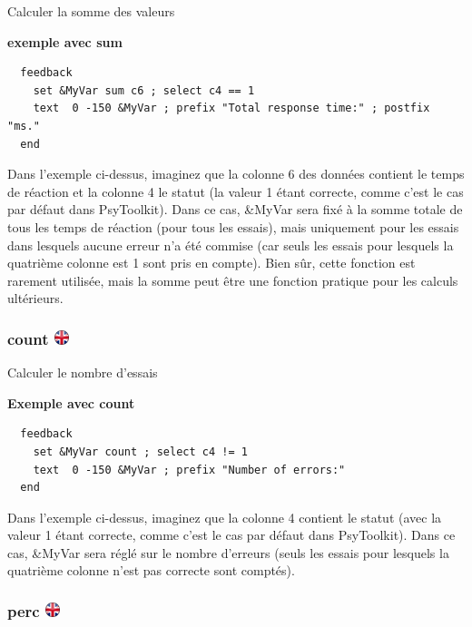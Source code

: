 \documentclass[
]{book}
\begin{document}
Calculer la somme des valeurs

\textbf{exemple avec sum }

\begin{verbatim}
  feedback
    set &MyVar sum c6 ; select c4 == 1
    text  0 -150 &MyVar ; prefix "Total response time:" ; postfix "ms."
  end
\end{verbatim}

Dans l'exemple ci-dessus, imaginez que la colonne 6 des données contient
le temps de réaction et la colonne 4 le statut (la valeur 1 étant
correcte, comme c'est le cas par défaut dans PsyToolkit). Dans ce cas,
\&MyVar sera fixé à la somme totale de tous les temps de réaction (pour
tous les essais), mais uniquement pour les essais dans lesquels aucune
erreur n'a été commise (car seuls les essais pour lesquels la quatrième
colonne est 1 sont pris en compte). Bien sûr, cette fonction est
rarement utilisée, mais la somme peut être une fonction pratique pour
les calculs ultérieurs.

\hypertarget{count}{%
\subsubsection[count ]{\texorpdfstring{count
\href{https://www.psytoolkit.org/doc3.1.0/feedback.html\#_count}{\protect\includegraphics{img/ukflag.png}}}{count }}\label{count}}

Calculer le nombre d'essais

\textbf{Exemple avec count}

\begin{verbatim}
  feedback
    set &MyVar count ; select c4 != 1
    text  0 -150 &MyVar ; prefix "Number of errors:"
  end
\end{verbatim}

Dans l'exemple ci-dessus, imaginez que la colonne 4 contient le statut
(avec la valeur 1 étant correcte, comme c'est le cas par défaut dans
PsyToolkit). Dans ce cas, \&MyVar sera réglé sur le nombre d'erreurs
(seuls les essais pour lesquels la quatrième colonne n'est pas correcte
sont comptés).

\hypertarget{perc}{%
\subsubsection[perc ]{\texorpdfstring{perc
\href{https://www.psytoolkit.org/doc3.1.0/feedback.html\#_perc}{\protect\includegraphics{img/ukflag.png}}}{perc }}\label{perc}}
\end{document}
